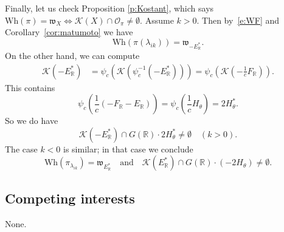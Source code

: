 \documentclass[cupthm]{CUP-JNL-JMJ}
\numberwithin{equation}{section}
\theoremstyle{cupplain}
\theoremstyle{cupdefinition}
\theoremstyle{cupremark}
\theoremstyle{cupproof}
\renewcommand{\O}{\mathcal O}
\newcommand{\R}{\mathbb R}
\newcommand{\K}{\mathcal K}
\newcommand\inv{^{-1}}
\newcommand{\w}{\mathfrak w}
\newcommand{\Wh}{\mathrm{Wh}}
\begin{document}
Finally, let us check Proposition \ref{p:Kostant}, 
which says $\Wh(\pi)=\w_X\Leftrightarrow \K(X)\cap\O_\pi\ne \emptyset$. 
Assume $k>0$. Then by~\eqref{e:WF} and Corollary~\ref{cor:matumoto} we have
$$
\Wh(\pi(\lambda_{ik}))=\mathfrak{w}_{-E_\R^*}.
$$
On the other hand, we can compute
$$
\begin{aligned}
\K(-E_\R^*)&=\psi_c(\K(\psi_c\inv(-E_\R^*))) =\psi_c(\K( -\frac 1cF_\R)).\end{aligned}$$
This contains
$$ \psi_c\left(\frac 1c(-F_\R-E_\R)\right)=\psi_c(\frac 1cH_\theta)=2H_\theta^*.
$$
So we do have
$$
\K(-E_\R^*)\cap G(\R)\cdot 2H_{\theta}^*\ne\emptyset\quad (k>0).
$$
The case $k<0$ is similar; in that case we conclude
\[ \Wh(\pi_{\lambda_{ik}})=\mathfrak{w}_{E_\R^\ast} \quad \text{and}\quad \K(E_\R^*)\cap G(\R)\cdot (-2H_\theta)\ne \emptyset.\]

\small

\subsection*{Competing interests} None. 




\bigskip
\end{document}
